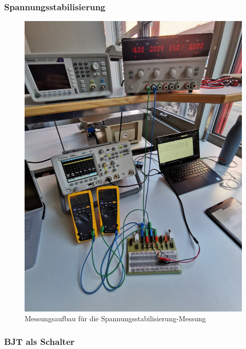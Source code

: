 \documentclass[../main.tex]{subfiles}
\begin{document}
\subsubsection{Spannungsstabilisierung}

\begin{figure}[h]
    \centering
    \includegraphics[scale=0.075]{assets/task2_voltage_stable/task2.jpg}
    \caption{Messungsaufbau für die Spannungsstabilisierung-Messung}
    \label{fig:setup_task2_1}
\end{figure}
\newpage
\subsubsection{BJT als Schalter}
\end{document}
